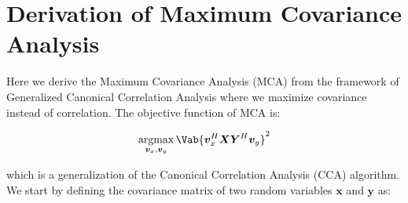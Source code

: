 \section*{Derivation of Maximum Covariance Analysis}
Here we derive the Maximum Covariance Analysis (MCA) from the framework of Generalized Canonical Correlation Analysis  where we maximize covariance instead of correlation. The objective function of MCA is:

\begin{align*}
    \argmax_{\bm{v}_x, \bm{v}_y} \Vab{\bm{v}_x^H\bm{X}\bm{Y}^H\bm{v}_y}^2
\end{align*}

 which is a generalization of the Canonical Correlation Analysis (CCA) algorithm. We start by defining the covariance matrix of two random variables $\bm{x}$ and $\bm{y}$ as: